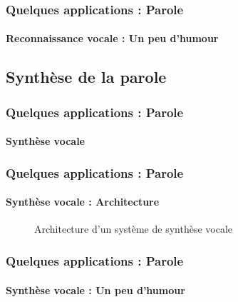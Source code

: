 \documentclass[xcolor=table]{beamer}
\begin{document}
\begin{frame}
	\frametitle{Quelques applications : Parole}
	\framesubtitle{Reconnaissance vocale : Un peu d'humour}
		\begin{center}
		\end{center}
\end{frame}

\subsection{Synthèse de la parole}

\begin{frame}
	\frametitle{Quelques applications : Parole}
	\framesubtitle{Synthèse vocale}
\end{frame}

\begin{frame}
	\frametitle{Quelques applications : Parole}
	\framesubtitle{Synthèse vocale : Architecture}
	\begin{figure}
		\centering
		\caption{Architecture d'un système de synthèse vocale \cite{2017-Hinterleitner}}
	\end{figure}
\end{frame}


\begin{frame}
	\frametitle{Quelques applications : Parole}
	\framesubtitle{Synthèse vocale : Un peu d'humour}
	\begin{center}
	\end{center}
\end{frame}


\end{document}
